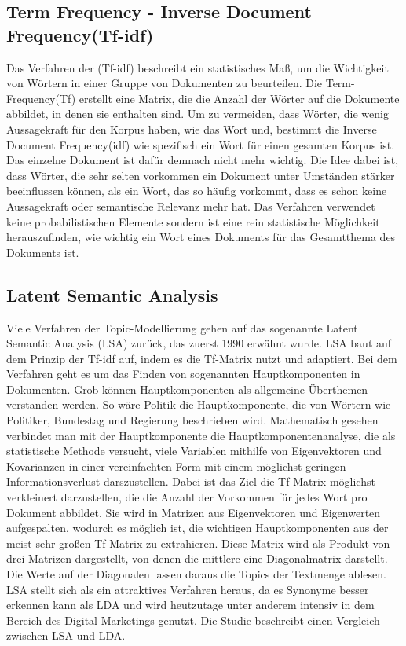 \documentclass[german,version-2020-11]{uzl-thesis}
\begin{document}
\subsection{Term Frequency - Inverse Document Frequency(Tf-idf)}
Das Verfahren der (Tf-idf) beschreibt ein statistisches Maß, um die Wichtigkeit von Wörtern in einer Gruppe von Dokumenten zu beurteilen. Die Term-Frequency(Tf) erstellt eine Matrix, die die Anzahl der Wörter auf die Dokumente abbildet, in denen sie enthalten sind. Um zu vermeiden, dass Wörter, die wenig Aussagekraft für den Korpus haben, wie das Wort \glqq und\grqq, bestimmt die Inverse Document Frequency(idf) wie spezifisch ein Wort für einen gesamten Korpus ist. Das einzelne Dokument ist dafür demnach nicht mehr wichtig. Die Idee dabei ist, dass Wörter, die sehr selten vorkommen ein Dokument unter Umständen stärker beeinflussen können, als ein Wort, das so häufig vorkommt, dass es schon keine Aussagekraft oder semantische Relevanz mehr hat. Das Verfahren verwendet keine probabilistischen Elemente sondern ist eine rein statistische Möglichkeit herauszufinden, wie wichtig ein Wort eines Dokuments für das Gesamtthema des Dokuments ist. 

\subsection{Latent Semantic Analysis}
Viele Verfahren der Topic-Modellierung gehen auf das sogenannte Latent Semantic Analysis (LSA) zurück, das zuerst 1990 erwähnt wurde. LSA baut auf dem Prinzip der Tf-idf auf, indem es die Tf-Matrix nutzt und adaptiert. Bei dem Verfahren geht es um das Finden von sogenannten Hauptkomponenten in Dokumenten. Grob können Hauptkomponenten als allgemeine Überthemen verstanden werden. So wäre Politik die Hauptkomponente, die von Wörtern wie Politiker, Bundestag und Regierung beschrieben wird. Mathematisch gesehen verbindet man mit der Hauptkomponente die Hauptkomponentenanalyse, die als statistische Methode versucht, viele Variablen mithilfe von Eigenvektoren und Kovarianzen in einer vereinfachten Form mit einem möglichst geringen Informationsverlust darszustellen. Dabei ist das Ziel die Tf-Matrix möglichst verkleinert darzustellen, die die Anzahl der Vorkommen für jedes Wort pro Dokument abbildet. Sie wird in Matrizen aus Eigenvektoren und Eigenwerten aufgespalten, wodurch es möglich ist, die wichtigen Hauptkomponenten aus der meist sehr großen Tf-Matrix zu extrahieren. Diese Matrix wird als Produkt von drei Matrizen dargestellt, von denen die mittlere eine Diagonalmatrix darstellt. Die Werte auf der Diagonalen lassen daraus die Topics der Textmenge ablesen. LSA stellt sich als ein attraktives Verfahren heraus, da es Synonyme besser erkennen kann als LDA und wird heutzutage unter anderem intensiv in dem Bereich des Digital Marketings genutzt. Die Studie \cite{t1} beschreibt einen Vergleich zwischen LSA und LDA. 
\end{document}

